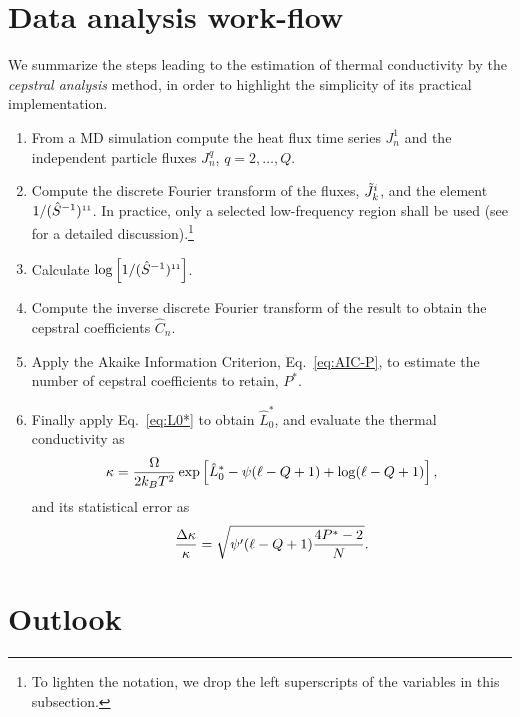 \section{Data analysis work-flow}
We summarize the steps leading to the estimation of thermal conductivity by the \textit{cepstral analysis} method, in order to highlight the simplicity of its practical implementation.
\begin{enumerate}
\item From a MD simulation compute the heat flux time series $J_n^1$ and the independent particle fluxes $J_n^q$, $q=2,\dots,Q$.
\item Compute the discrete Fourier transform of the fluxes, $\tilde{J}^{\small i}_k$, and the element $1/(\hat{S}^{-1})^{{\scriptscriptstyle 1}{\scriptscriptstyle 1}}$. In practice, only a selected low-frequency region shall be used (see \cite{Ercole2017} for a detailed discussion).\footnote{To lighten the notation, we drop the left superscripts of the variables in this subsection.}
\item Calculate $\log\left[1/(\hat{S}^{-1})^{{\scriptscriptstyle 1}{\scriptscriptstyle 1}}\right]$.
\item Compute the inverse discrete Fourier transform of the result to obtain the cepstral coefficients $\hat{C}_n$.
\item Apply the Akaike Information Criterion, Eq.~\eqref{eq:AIC-P}, to estimate the number of cepstral coefficients to retain, $P^*$.
\item Finally apply Eq.~\eqref{eq:L0*} to obtain $\hat{L}_0^*$, and evaluate the thermal conductivity as
\begin{equation}
\kappa = \frac{{\mathrm\Omega}}{2k_B T^2} \exp\left[\hat{L}_0^* - \psi(\ell - Q+1) + \log(\ell -Q+1) \right],
\end{equation}
and its statistical error as
\begin{equation}
\frac{{\mathrm\Delta}\kappa}{\kappa} = \sqrt{\psi'(\ell -Q+1) \frac{4P^{*}-2}{N}}.
\end{equation}
\end{enumerate}


\section{Outlook}